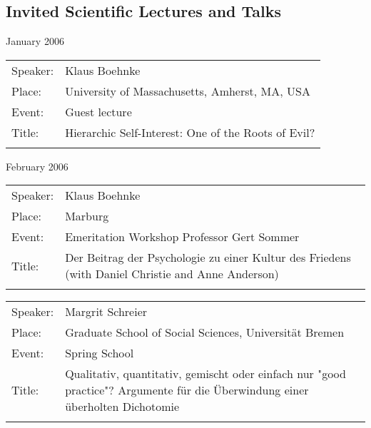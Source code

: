 
\newpage
\subsection{Invited Scientific Lectures and Talks}



{
\begin{flushleft}
January 2006\\[0.5cm] 
\end{flushleft}
\begin{tabular}{lp{13.4cm}}
 Speaker:	&   Klaus Boehnke \\
 Place: 	 & University of Massachusetts, Amherst, MA, USA\\
 Event:   &	Guest lecture\\
 Title: &		Hierarchic Self-Interest: One of the Roots of Evil? \\ \\
\end{tabular}
	

\begin{flushleft}
February 2006\\[0.5cm] 
\end{flushleft}
\begin{tabular}{lp{13.4cm}}
 Speaker:	&   Klaus Boehnke \\
 Place: 	 &Marburg\\
 Event:   &	Emeritation Workshop Professor Gert Sommer\\
 Title: &	Der Beitrag der Psychologie zu einer Kultur des Friedens (with Daniel Christie and Anne Anderson) \\ \\
\end{tabular}
\begin{tabular}{lp{13.4cm}}
 Speaker:	&   Margrit Schreier \\
 Place: 	 &Graduate School of Social Sciences, Universit\"{a}t Bremen\\
 Event:   &	Spring School\\
 Title: &		Qualitativ, quantitativ, gemischt oder einfach nur "good practice"? Argumente f\"{u}r die \"{U}berwindung einer \"{u}berholten Dichotomie \\ \\
\end{tabular}
	





}
